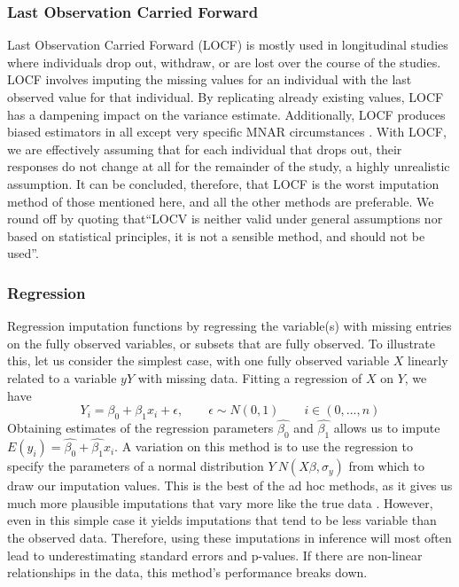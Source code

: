 \documentclass{article}
\begin{document}
	\subsubsection{Last Observation Carried Forward}
	Last Observation Carried Forward (LOCF) is mostly used in longitudinal studies where individuals drop out, withdraw, or are lost over the course of the studies. LOCF involves imputing the missing values for an individual with the last observed value for that individual. By replicating already existing values, LOCF has a dampening impact on the variance estimate. Additionally, LOCF produces biased estimators in all except very specific MNAR circumstances \cite{KenwardM.G.andMolenberghs2009}. With LOCF, we are effectively assuming that for each individual that drops out, their responses do not change at all for the remainder of the study, a highly unrealistic assumption. It can be concluded, therefore, that LOCF is the worst imputation method of those mentioned here, and all the other methods are preferable. We round off by quoting \cite[P. 40]{Molenberghs2015} that\enquote{LOCV is neither valid under general assumptions nor based on statistical principles, it is not a sensible method, and should not be used}.
	
	\subsubsection{Regression}
	Regression imputation functions by regressing the variable(s) with missing entries on the fully observed variables, or subsets that are fully observed. To illustrate this, let us consider the simplest case, with one fully observed variable $X$ linearly related to a variable $y
	Y$ with missing data. Fitting a regression of $X$ on $Y$, we have$$Y_{i} = \beta_{0} + \beta_{1}x_{i} + \epsilon, \qquad \epsilon \sim N(0,1) \qquad i\in(0,...,n)$$ Obtaining estimates of the regression parameters $\hat{\beta_{0}}$ and $\hat{\beta_{1}}$ allows us to impute $E(y_{i}) = \hat{\beta_{0}} + \hat{\beta_{1}}x_{i}$. A variation on this method is to use the regression to specify the parameters of a normal distribution $Y ~ N(X\beta, \sigma_{y})$ from which to draw our imputation values.  This is the best of the ad hoc methods, as it gives us much more plausible imputations that vary more like the true data \cite[P. 37]{Molenberghs2015}. However, even in this simple case it yields imputations that tend to be less variable than the observed data. Therefore, using these imputations in inference will most often lead to underestimating standard errors and p-values. If there are non-linear relationships in the data, this method's performance breaks down.
	
\end{document}
